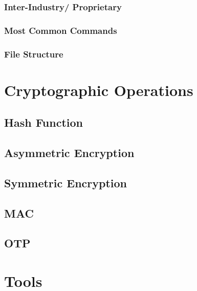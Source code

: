 \documentclass[bsc,frontabs,twoside,singlespacing,parskip,deptreport]{infthesis}     %
\begin{document}
\subsection{Inter-Industry/ Proprietary}
\subsection{Most Common Commands}
\subsection{File Structure}






\chapter{Cryptographic Operations}

\section{Hash Function}

\section{Asymmetric Encryption}

\section{Symmetric Encryption}

\section{MAC}

\section{OTP}





\chapter{Tools}
\end{document}
